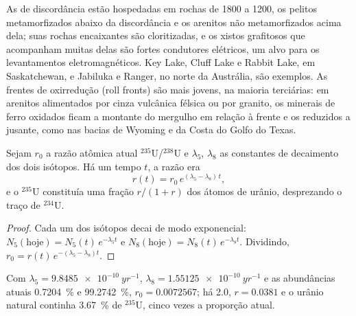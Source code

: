 As  de discordância estão hospedadas em rochas de 1800 a \qty{1200}{\Ma}, os pelitos metamorfizados
abaixo da discordância e os arenitos não metamorfizados acima dela; suas rochas encaixantes são cloritizadas, e os xistos grafitosos que
acompanham muitas delas são fortes condutores elétricos, um alvo para os levantamentos eletromagnéticos. Key
Lake, Cluff Lake e Rabbit Lake, em Saskatchewan, e Jabiluka e Ranger, no norte da Austrália, são
exemplos. As frentes de oxirredução (roll fronts) são mais jovens, na maioria terciárias: em arenitos alimentados por cinza vulcânica félsica ou por
granito, os minerais de ferro oxidados ficam a montante do mergulho em relação à frente e os reduzidos a jusante, como nas bacias
de Wyoming e da Costa do Golfo do Texas.

\begin{proposition}\label{prop:b2:energy-geology:u235}
Sejam $r_0$ a razão atômica atual $^{235}$U/$^{238}$U e $\lambda_5$, $\lambda_8$ as constantes de
decaimento dos dois isótopos. Há um tempo $t$, a razão era
\begin{equation}
r(t) = r_0\,e^{(\lambda_5 - \lambda_8)\,t} ,
\label{eq:b2:energy-geology:u235}
\end{equation}
e o $^{235}$U constituía uma fração $r/(1 + r)$ dos átomos de urânio, desprezando o traço de
$^{234}$U.
\end{proposition}

\begin{proof}
Cada um dos isótopos decai de modo exponencial: $N_5(\text{hoje}) = N_5(t)\,e^{-\lambda_5 t}$ e $N_8(\text{hoje})
= N_8(t)\,e^{-\lambda_8 t}$. Dividindo, $r_0 = r(t)\,e^{-(\lambda_5 - \lambda_8)t}$.
\end{proof}

Com $\lambda_5 = \qty{9.8485e-10}{yr^{-1}}$, $\lambda_8 = \qty{1.55125e-10}{yr^{-1}}$ e as
abundâncias atuais \qty{0.7204}{\percent} e \qty{99.2742}{\percent}, $r_0 = 0.0072567$; há \qty{2.0}{\Ga},
$r = 0.0381$ e o urânio natural continha \qty{3.67}{\percent} de $^{235}$U, cinco vezes a
proporção atual.

